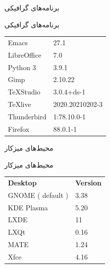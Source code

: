 \documentclass[hyperref={colorlinks}]{beamer}
\begin{document}
\begin{persian}
\begin{frame}{برنامه‌های گرافیکی}
\begin{block}{برنامه‌های گرافیکی}

\begin{latin}
\begin{tabular}{ll} 

Emacs & 27.1 \\
LibreOffice & 7.0 \\
Python 3 & 3.9.1 \\
Gimp & 2.10.22 \\
TeXStudio & 3.0.4+ds-1 \\
TeXlive & 2020.20210202-3 \\
Thunderbird & 1:78.10.0-1 \\
Firefox & 88.0.1-1 \\
\end{tabular}
\end{latin}

\end{block}
\end{frame}
\end{persian}
\begin{persian}
\begin{frame}{محیط‌های میزکار}
\begin{block}{محیط‌های میزکار}
\begin{latin}
\begin{tabular}{ll} 
\textbf{Desktop} & \textbf{Version} \\
GNOME ( default ) & 3.38 \\
KDE Plasma & 5.20 \\
LXDE & 11 \\
LXQt & 0.16 \\
MATE & 1.24 \\
Xfce & 4.16 \\
\end{tabular}
\end{latin}

\end{block}
\end{frame}
\end{persian}
\end{document}
